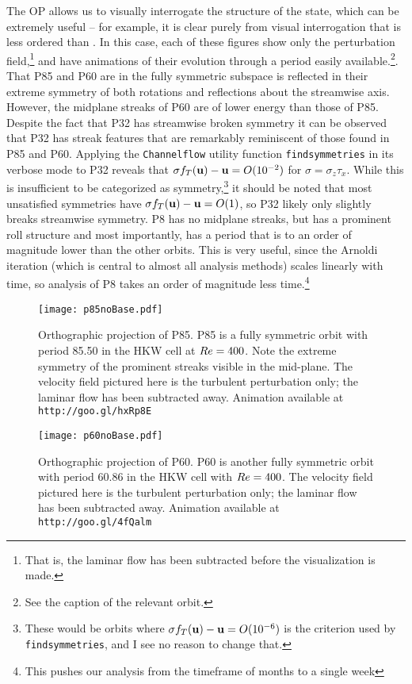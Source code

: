 The OP allows us to visually interrogate the structure of the state, which can be extremely useful -- for example, it is clear purely from visual interrogation that  is less ordered than . In this case, each of these figures show only the perturbation field,\footnote{That is, the laminar flow has been subtracted before the visualization is made.} and have animations of their evolution through a period easily available.\footnote{See the caption of the relevant orbit.}. That P85 and P60 are in the fully symmetric subspace is reflected in their extreme symmetry of both rotations and reflections about the streamwise axis. However, the midplane streaks of P60 are of lower energy than those of P85. Despite the fact that P32 has streamwise broken symmetry it can be observed that P32 has streak features that are remarkably reminiscent of those found in P85 and P60. Applying the {\tt Channelflow} utility function {\tt findsymmetries} in its verbose mode to P32 reveals that $\sigma f_T(\mathbf{u}) - \mathbf{u} = O(10^{-2})$ for $\sigma = \sigma_z \tau_x$. While this is insufficient to be categorized as  symmetry,\footnote{These would be orbits where $\sigma f_T(\mathbf{u}) - \mathbf{u} = O(10^{-6})$ is the criterion used by {\tt findsymmetries}, and I see no reason to change that.} it should be noted that most unsatisfied symmetries have  $\sigma f_T(\mathbf{u}) - \mathbf{u} = O(1)$, so P32 likely only slightly breaks streamwise symmetry.   P8 has no midplane streaks, but has a prominent roll structure and most importantly, has a period that is to an order of magnitude lower than the other orbits. This is very useful, since the Arnoldi iteration (which is central to almost all analysis methods) scales linearly with time, so analysis of P8 takes an order of magnitude less time.\footnote{This pushes our analysis from the timeframe of months to a single week}

\begin{figure}
\centerline{\texttt{[image: p85noBase.pdf]}}
\caption{Orthographic projection of P85. P85 is a fully symmetric orbit with period 85.50 in the HKW cell at $Re=400$. Note the extreme symmetry of the prominent streaks visible in the mid-plane. The velocity field pictured here is the turbulent perturbation only; the laminar flow has been subtracted away.{ Animation available at {\tt http://goo.gl/hxRp8E}}}\label{fig:p85}
\end{figure}

\begin{figure}
\centerline{\texttt{[image: p60noBase.pdf]}}
\caption{Orthographic projection of P60. P60 is another fully symmetric orbit with period 60.86 in the HKW cell with $Re = 400$.  The velocity field pictured here is the turbulent perturbation only; the laminar flow has been subtracted away.{ Animation available at {\tt http://goo.gl/4fQalm}}}\label{fig:p60}
\end{figure}


